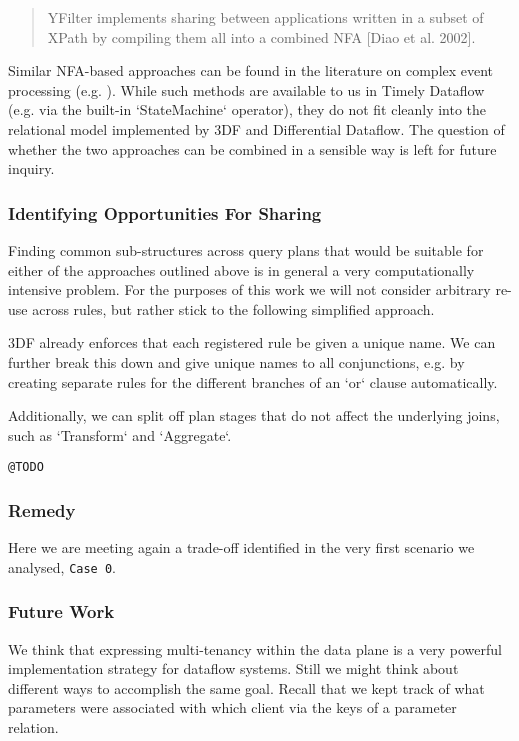 \documentclass[../catalog.tex]{subfiles}
\begin{document}
\begin{quote}
YFilter implements sharing between applications written in a subset of
XPath by compiling them all into a combined NFA [Diao et al. 2002].
\end{quote}

Similar NFA-based approaches can be found in the literature on complex
event processing (e.g. \cite{agrawal2008}). While such methods are
available to us in Timely Dataflow (e.g. via the built-in
`StateMachine` operator), they do not fit cleanly into the relational
model implemented by 3DF and Differential Dataflow. The question of
whether the two approaches can be combined in a sensible way is left
for future inquiry.

\subsubsection{Identifying Opportunities For Sharing}

Finding common sub-structures across query plans that would be
suitable for either of the approaches outlined above is in general a
very computationally intensive problem. For the purposes of this work
we will not consider arbitrary re-use across rules, but rather stick
to the following simplified approach.

3DF already enforces that each registered rule be given a unique
name. We can further break this down and give unique names to all
conjunctions, e.g. by creating separate rules for the different
branches of an `or` clause automatically.

Additionally, we can split off plan stages that do not affect the
underlying joins, such as `Transform` and `Aggregate`.

\texttt{@TODO}

\subsubsection{Remedy}

Here we are meeting again a trade-off identified in the very first
scenario we analysed, \texttt{Case 0}.

\subsubsection{Future Work}

We think that expressing multi-tenancy within the data plane is a very
powerful implementation strategy for dataflow systems. Still we might
think about different ways to accomplish the same goal. Recall that we
kept track of what parameters were associated with which client via
the keys of a parameter relation.
\end{document}
